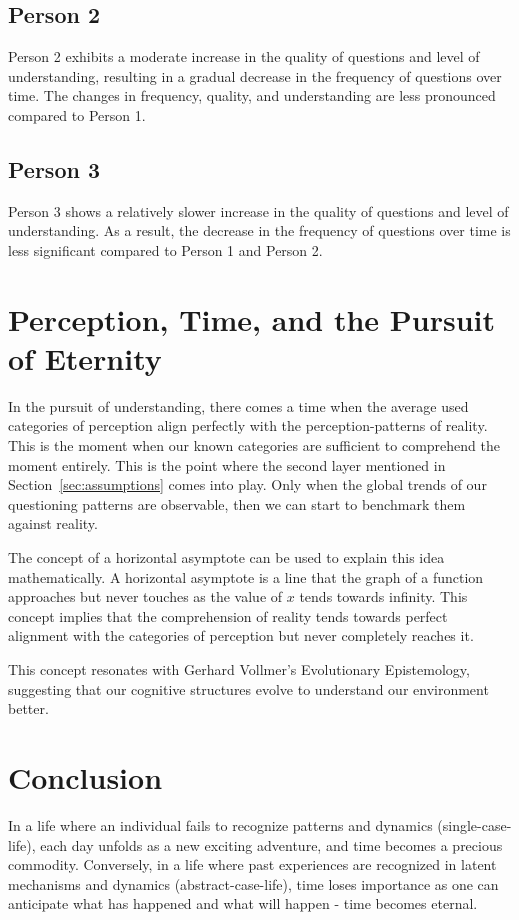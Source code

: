 \documentclass{article}
\begin{document}
\subsection{Person 2}

Person 2 exhibits a moderate increase in the quality of questions and level of understanding, resulting in a gradual decrease in the frequency of questions over time. The changes in frequency, quality, and understanding are less pronounced compared to Person 1.

\subsection{Person 3}

Person 3 shows a relatively slower increase in the quality of questions and level of understanding. As a result, the decrease in the frequency of questions over time is less significant compared to Person 1 and Person 2.

\section{Perception, Time, and the Pursuit of Eternity}

In the pursuit of understanding, there comes a time when the average used categories of perception align perfectly with the perception-patterns of reality. This is the moment when our known categories are sufficient to comprehend the moment entirely. This is the point where the second layer mentioned in Section~\ref{sec:assumptions} comes into play. Only when the global trends of our questioning patterns are observable, then we can start to benchmark them against reality.

The concept of a horizontal asymptote can be used to explain this idea mathematically. A horizontal asymptote is a line that the graph of a function approaches but never touches as the value of $x$ tends towards infinity. This concept implies that the comprehension of reality tends towards perfect alignment with the categories of perception but never completely reaches it.

This concept resonates with Gerhard Vollmer's Evolutionary Epistemology, suggesting that our cognitive structures evolve to understand our environment better.

\section{Conclusion}

In a life where an individual fails to recognize patterns and dynamics (single-case-life), each day unfolds as a new exciting adventure, and time becomes a precious commodity. Conversely, in a life where past experiences are recognized in latent mechanisms and dynamics (abstract-case-life), time loses importance as one can anticipate what has happened and what will happen - time becomes eternal.
\end{document}
